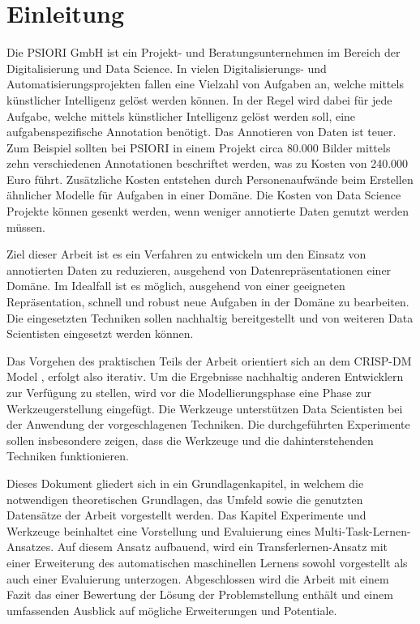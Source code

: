 \chapter{Einleitung}
\label{chap:Einleitung}
	Die PSIORI GmbH \cite{PSIORIGmbH.2020} ist ein Projekt- und Beratungsunternehmen im Bereich der Digitalisierung und Data Science. In vielen Digitalisierungs- und Automatisierungsprojekten fallen eine Vielzahl von Aufgaben an, welche mittels künstlicher Intelligenz gelöst werden können. In der Regel wird dabei für jede Aufgabe, welche mittels künstlicher Intelligenz gelöst werden soll, eine aufgabenspezifische Annotation benötigt. Das Annotieren von Daten ist teuer. Zum Beispiel sollten bei PSIORI in einem Projekt circa 80.000 Bilder mittels zehn verschiedenen Annotationen beschriftet werden, was zu Kosten von 240.000 Euro führt. Zusätzliche Kosten entstehen durch Personenaufwände beim Erstellen ähnlicher Modelle für Aufgaben in einer Domäne. Die Kosten von Data Science Projekte können gesenkt werden, wenn weniger annotierte Daten genutzt werden müssen.
	
	Ziel dieser Arbeit ist es ein Verfahren zu entwickeln um den Einsatz von annotierten Daten zu reduzieren, ausgehend von Datenrepräsentationen einer Domäne. Im Idealfall ist es möglich, ausgehend von einer geeigneten Repräsentation, schnell und robust neue Aufgaben in der Domäne zu bearbeiten. Die eingesetzten Techniken sollen nachhaltig bereitgestellt und von weiteren Data Scientisten eingesetzt werden können.
	
	Das Vorgehen des praktischen Teils der Arbeit orientiert sich an dem CRISP-DM Model \cite{Shearer.2000}, erfolgt also iterativ. Um die Ergebnisse nachhaltig anderen Entwicklern zur Verfügung zu stellen, wird vor die Modellierungsphase eine Phase zur Werkzeugerstellung eingefügt. Die Werkzeuge unterstützen Data Scientisten bei der Anwendung der vorgeschlagenen Techniken. Die durchgeführten Experimente sollen insbesondere zeigen, dass die Werkzeuge und die dahinterstehenden Techniken funktionieren. 
	
	Dieses Dokument gliedert sich in ein Grundlagenkapitel, in welchem die notwendigen theoretischen Grundlagen, das Umfeld sowie die genutzten Datensätze der Arbeit vorgestellt werden. Das Kapitel Experimente und Werkzeuge beinhaltet eine Vorstellung und Evaluierung eines Multi-Task-Lernen-Ansatzes. Auf diesem Ansatz aufbauend, wird ein Transferlernen-Ansatz mit einer Erweiterung des automatischen maschinellen Lernens sowohl vorgestellt als auch einer Evaluierung unterzogen. Abgeschlossen wird die Arbeit mit einem Fazit das einer Bewertung der Lösung der Problemstellung enthält und einem umfassenden Ausblick auf mögliche Erweiterungen und Potentiale.

